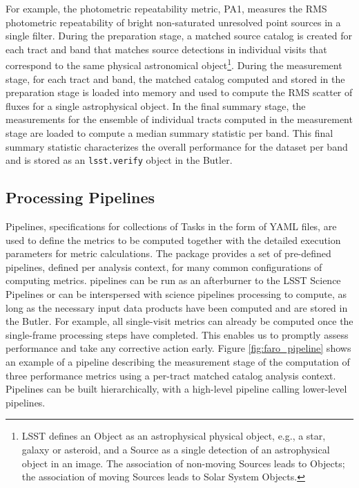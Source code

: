 For example, the photometric repeatability metric, PA1, measures the RMS photometric repeatability of bright non-saturated unresolved point sources in a single filter.
During the preparation stage, a matched source catalog is created for each tract and band that matches source detections in individual visits that correspond to the same physical astronomical object\footnote{LSST defines an Object as an astrophysical physical object, e.g., a star, galaxy or asteroid, and a Source as a single detection of an astrophysical object in an image. The association of non-moving Sources leads to Objects; the association of moving Sources leads to Solar System Objects.}.
During the measurement stage, for each tract and band, the matched catalog computed and stored in the preparation stage is loaded into memory and used to compute the RMS scatter of fluxes for a single astrophysical object. 
In the final summary stage, the measurements for the ensemble of individual tracts computed in the measurement stage are loaded to compute a median summary statistic per band. 
This final summary statistic characterizes the overall performance for the dataset per band and is stored as an \texttt{lsst.verify} object in the Butler. 

\subsection{Processing Pipelines} \label{ssec:pipelines}

Pipelines, specifications for collections of Tasks in the form of YAML files, are used to define the \faro metrics to be computed together with the detailed execution parameters for metric calculations.
The \faro package provides a set of pre-defined pipelines, defined per analysis context, for many common configurations of computing metrics. 
\faro pipelines can be run as an afterburner to the LSST Science Pipelines or can be interspersed with science pipelines processing to compute, as long as the necessary input data products have been computed and are stored in the Butler.
For example, all single-visit metrics can already be computed once the single-frame processing steps have completed. 
This enables us to promptly assess performance and take any corrective action early. 
Figure \ref{fig:faro_pipeline} shows an example of a \faro pipeline describing the measurement stage of the computation of three performance metrics using a per-tract matched catalog analysis context.
Pipelines can be built hierarchically, with a high-level pipeline calling lower-level pipelines.

